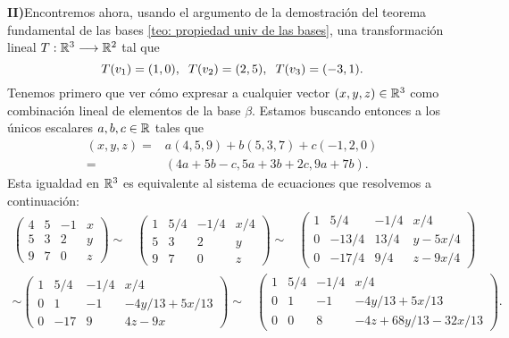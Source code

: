 \textbf{II)}Encontremos ahora, usando el argumento de la demostración
del teorema fundamental de las bases
\ref{teo: propiedad univ de las bases}, una transformación
lineal $T: \mathbb{R}^{3} \longrightarrow \mathbb{R}^{2}$ tal que 
\begin{equation}
	\label{eq: condiciones para T ejemplo}
	T(v_{1}) = (1, 0), \hspace{0.2cm}
	T(v_{2}) = (2, 5), \hspace{0.2cm}
	T(v_{3}) = (-3, 1).
\end{equation}
Tenemos primero que ver cómo expresar a cualquier vector
$(x, y, z) \in \mathbb{R}^{3}$ como combinación lineal de elementos
de la base $\beta$. Estamos buscando entonces a los únicos
escalares $a, b, c \in \mathbb{R}$ tales que 
\begin{align*}
(x, y, z) = & a (4, 5, 9) + b (5, 3, 7) + c(-1, 2, 0) \\
= & (4a+5b-c, 5a+3b+2c, 9a+7b).
\end{align*}
Esta igualdad en $\mathbb{R}^{3}$ es equivalente al sistema de ecuaciones
que resolvemos a continuación:
\begin{align*}
\left( \begin{array}{rrr|r} 
4 & 5 & -1 & x  \\ 
5 & 3 & 2 & y  \\ 
9 & 7 & 0 & z
\end{array} \right) \sim &
\left( \begin{array}{rrr|r} 
1 & 5/4 & -1/4 & x/4  \\ 
5 & 3 & 2 & y  \\ 
9 & 7 & 0 & z
\end{array} \right) \sim &
\left( \begin{array}{rrr|r} 
1 & 5/4 & -1/4 & x/4  \\ 
0 & -13/4 & 13/4 & y - 5x/4  \\ 
0 & -17/4 & 9/4 & z-9x/4
\end{array} \right) 
\end{align*}
\begin{align*}
\sim
\left( \begin{array}{rrr|r} 
1 & 5/4 & -1/4 & x/4  \\ 
0 & 1 & -1 & -4y/13 + 5x/13  \\ 
0 & -17 & 9 & 4z-9x
\end{array} \right) \sim &
\left( \begin{array}{rrr|r} 
1 & 5/4 & -1/4 & x/4  \\ 
0 & 1 & -1 & -4y/13 + 5x/13  \\ 
0 & 0 & 8 & -4z+68y/13 - 32x/13
\end{array} \right) .
\end{align*}
